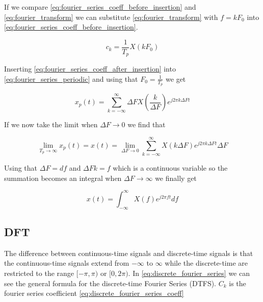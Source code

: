 \documentclass[../main.tex]{subfiles}
\begin{document}
If we compare \eqref{eq:fourier_series_coeff_before_insertion} and \eqref{eq:fourier_transform} we can substitute \eqref{eq:fourier_transform} with $f=kF_0$ into \eqref{eq:fourier_series_coeff_before_insertion}.

\begin{equation}
    \label{eq:fourier_series_coeff_after_insertion}
    c_k = \frac{1}{T_p} X(kF_0)
\end{equation}

Inserting \eqref{eq:fourier_series_coeff_after_insertion} into \eqref{eq:fourier_series_periodic} and using that $F_0 = \frac{1}{T_p}$ we get

\begin{equation*}
    x_p(t) = \sum_{k=-\infty}^{\infty} \Delta F X(\frac{k}{\Delta F}) e^{j 2 \pi k \Delta F t}
\end{equation*}

If we now take the limit when $\Delta F \to 0$ we find that

\begin{equation*}
    \lim_{T_p \to \infty} x_p(t) = x(t) = \lim_{\Delta F \to 0} \sum_{k = -\infty}^{\infty} X(k \Delta F) e^{j 2 \pi k \Delta F t} \Delta F
\end{equation*}

Using that $\Delta F = df$ and $\Delta F k = f$ which is a continuous variable so the summation becomes an integral when $\Delta F \to \infty$ we finally get

\begin{equation}
    x(t) = \int_{-\infty}^{\infty} X(f) e^{j 2 \pi f t} df
\end{equation}


\subsection{DFT}%
\label{sub:dft}

The difference between continuous-time signals and discrete-time signals is that the continuous-time signals extend from $-\infty$ to $\infty$ while the discrete-time are restricted to the range $[-\pi, \pi)$ or $[0, 2 \pi)$.
In \eqref{eq:discrete_fourier_series} we can see the general formula for the discrete-time Fourier Series (DTFS).
$C_k$ is the fourier series coefficient \eqref{eq:discrete_fourier_series_coeff}
\end{document}
